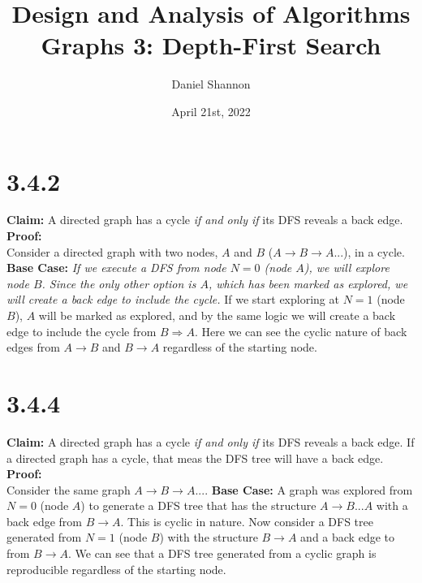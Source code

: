 \documentclass[12pt, letterpaper, twoside]{article}
\title{%
Design and Analysis of Algorithms\\
\large Graphs 3: Depth-First Search
}
\author{Daniel Shannon}
\date{April 21st, 2022}
\begin{document}
\begin{titlepage}
\maketitle
\end{titlepage}
\section*{3.4.2}

\textbf{Claim:} A directed graph has a cycle \emph{if and only if} its DFS reveals a back edge.
\\
\textbf{Proof:}
\\
Consider a directed graph with two nodes, $A$ and $B$ ($A\rightarrow{B}\rightarrow{A}...$), in a cycle. \textbf{Base Case:} \emph{If we execute a DFS from node $N=0$ (node $A$),
we will explore node $B$. Since the only other option is $A$, which has been marked as explored, we will create a back edge to include the cycle.}
If we start exploring at $N=1$ (node $B$), $A$ will be marked as explored, and by the same logic we will create a back edge to include the cycle from $B\Rightarrow{A}$.
Here we can see the cyclic nature of back edges from $A\rightarrow{B}$ and $B\rightarrow{A}$ regardless of the starting node.

\section*{3.4.4}
\textbf{Claim:} A directed graph has a cycle \emph{if and only if} its DFS reveals a back edge. If a directed graph has a cycle, that meas the DFS tree will have a back edge.
\\
\textbf{Proof:}
\\
Consider the same graph $A\rightarrow{B}\rightarrow{A}...$. \textbf{Base Case:} A graph was explored from $N=0$ (node $A$) to generate a DFS tree that has the structure $A\rightarrow{B}...A$ 
with a back edge from $B\rightarrow{A}$. This is cyclic in nature. Now consider a DFS tree generated from $N=1$ (node $B$) with the structure $B\rightarrow{A}$ 
and a back edge to from $B\rightarrow{A}$. We can see that a DFS tree generated from a cyclic graph is reproducible regardless of the starting node.
\end{document}
